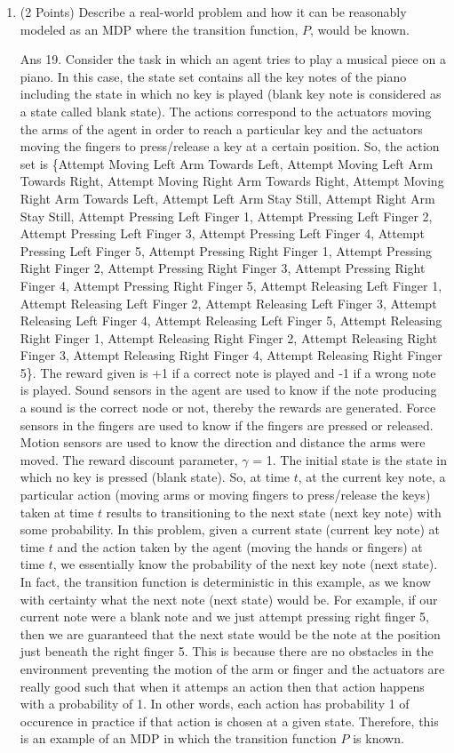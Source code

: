 \documentclass[]{article}
\begin{document}
\begin{enumerate}
    
    
    \item (2 Points) Describe a real-world problem and how it can be reasonably modeled as an MDP where the transition function, $P$, would be known.

	{
		\color{blue}
			Ans 19. Consider the task in which an agent tries to play a musical piece on a piano. In this case, the state set contains all the key notes of the piano including the state in which no key is played (blank key note is considered as a state called blank state). The actions correspond to the actuators moving the arms of the agent in order to reach a particular key and the actuators moving the fingers to press/release a key at a certain position. So, the action set is \{Attempt Moving Left Arm Towards Left, Attempt Moving Left Arm Towards Right, Attempt Moving Right Arm Towards Right, Attempt Moving Right Arm Towards Left, Attempt Left Arm Stay Still, Attempt Right Arm Stay Still, Attempt Pressing Left Finger 1, Attempt Pressing Left Finger 2, Attempt Pressing Left Finger 3, Attempt Pressing Left Finger 4, Attempt Pressing Left Finger 5, Attempt Pressing Right Finger 1, Attempt Pressing Right Finger 2, Attempt Pressing Right Finger 3, Attempt Pressing Right Finger 4, Attempt Pressing Right Finger 5, Attempt Releasing Left Finger 1, Attempt Releasing Left Finger 2, Attempt Releasing Left Finger 3, Attempt Releasing Left Finger 4, Attempt Releasing Left Finger 5, Attempt Releasing Right Finger 1, Attempt Releasing Right Finger 2, Attempt Releasing Right Finger 3, Attempt Releasing Right Finger 4, Attempt Releasing Right Finger 5\}. The reward given is +1 if a correct note is played and -1 if a wrong note is played. Sound sensors in the agent are used to know if the note producing a sound is the correct node or not, thereby the rewards are generated. Force sensors in the fingers are used to know if the fingers are pressed or released. Motion sensors are used to know the direction and distance the arms were moved. The reward discount parameter, $\gamma$ = 1. The initial state is the state in which no key is pressed (blank state). So, at time $t$, at the current key note, a particular action (moving arms or moving fingers to press/release the keys) taken at time $t$ results to transitioning to the next state (next key note) with some probability. In this problem, given a current state (current key note) at time $t$ and the action taken by the agent (moving the hands or fingers) at time $t$, we essentially know the probability of the next key note (next state). In fact, the transition function is deterministic in this example, as we know with certainty what the next note (next state) would be. For example, if our current note were a blank note and we just attempt pressing right finger 5, then we are guaranteed that the next state would be the note at the position just beneath the right finger 5. This is because there are no obstacles in the environment preventing the motion of the arm or finger and the actuators are really good such that when it attemps an action then that action happens with a probability of 1. In other words, each action has probability 1 of occurence in practice if that action is chosen at a given state.  Therefore, this is an example of an MDP in which the transition function $P$ is known.
}
\end{enumerate}
\end{document}
